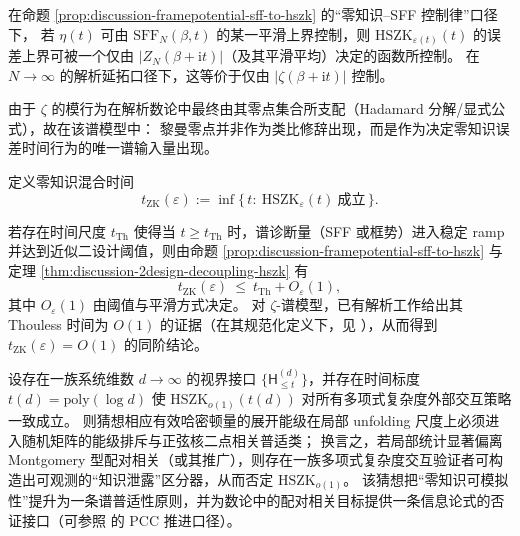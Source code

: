 \begin{proposition}\label{prop:discussion-zeta-spectral-hszk}
在命题 \ref{prop:discussion-framepotential-sff-to-hszk} 的“零知识--SFF 控制律”口径下，
若 \(\eta(t)\) 可由 \(\mathrm{SFF}_N(\beta,t)\) 的某一平滑上界控制，则 \(\mathrm{HSZK}_{\varepsilon(t)}(t)\) 的误差上界可被一个仅由 \(|Z_N(\beta+\mathrm{i}t)|\)（及其平滑平均）决定的函数所控制。
在 \(N\to\infty\) 的解析延拓口径下，这等价于仅由 \(|\zeta(\beta+\mathrm{i}t)|\) 控制。
\par
由于 \(\zeta\) 的模行为在解析数论中最终由其零点集合所支配（Hadamard 分解/显式公式），故在该谱模型中：
黎曼零点并非作为类比修辞出现，而是作为决定零知识误差时间行为的唯一谱输入量出现。
\end{proposition}

\begin{definition}[零知识混合时间]\label{def:discussion-zk-mixing-time}
定义零知识混合时间
\[
t_{\mathrm{ZK}}(\varepsilon):=\inf\{\,t:\ \mathrm{HSZK}_{\varepsilon}(t)\ \text{成立}\,\}.
\]
\end{definition}

\begin{corollary}\label{cor:discussion-zk-vs-thouless}
若存在时间尺度 \(t_{\mathrm{Th}}\) 使得当 \(t\ge t_{\mathrm{Th}}\) 时，谱诊断量（SFF 或框势）进入稳定 ramp 并达到近似二设计阈值，则由命题 \ref{prop:discussion-framepotential-sff-to-hszk} 与定理 \ref{thm:discussion-2design-decoupling-hszk} 有
\[
t_{\mathrm{ZK}}(\varepsilon)\ \le\ t_{\mathrm{Th}}+O_\varepsilon(1),
\]
其中 \(O_\varepsilon(1)\) 由阈值与平滑方式决定。
对 \(\zeta\)-谱模型，已有解析工作给出其 Thouless 时间为 \(O(1)\) 的证据（在其规范化定义下，见 \cite{BasuDasKrishnan2025AnalyticZetaRamp}），从而得到 \(t_{\mathrm{ZK}}(\varepsilon)=O(1)\) 的同阶结论。
\end{corollary}

\begin{conjecture}[视界零知识的谱刚性猜想：HSZK \texorpdfstring{$\Rightarrow$}{=>} 正弦核相关]\label{conj:discussion-horizon-zk-rigidity}
设存在一族系统维数 \(d\to\infty\) 的视界接口 \(\{\mathsf{H}^{(d)}_{\le t}\}\)，并存在时间标度 \(t(d)=\mathrm{poly}(\log d)\) 使
\(\mathrm{HSZK}_{o(1)}(t(d))\)
对所有多项式复杂度外部交互策略一致成立。
则猜想相应有效哈密顿量的展开能级在局部 unfolding 尺度上必须进入随机矩阵的能级排斥与正弦核二点相关普适类；
换言之，若局部统计显著偏离 Montgomery 型配对相关（或其推广），则存在一族多项式复杂度交互验证者可构造出可观测的“知识泄露”区分器，从而否定 \(\mathrm{HSZK}_{o(1)}\)。
该猜想把“零知识可模拟性”提升为一条谱普适性原则，并为数论中的配对相关目标提供一条信息论式的否证接口（可参照 \cite{GoldstonLeeSchettlerSuriajaya2025PairCorrelationConjecture} 的 PCC 推进口径）。
\end{conjecture}

